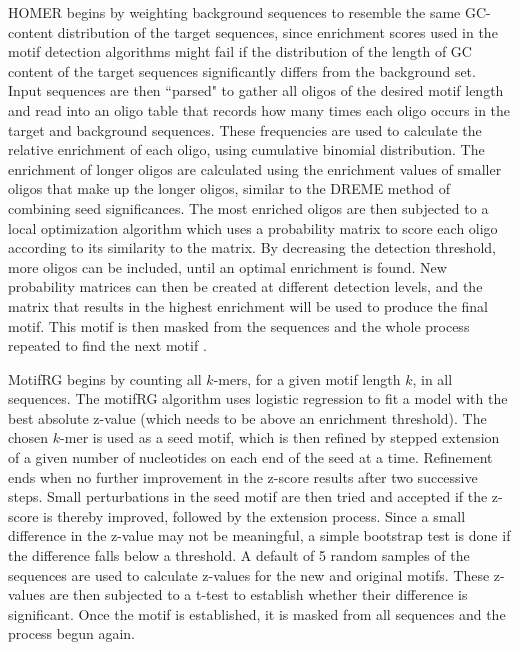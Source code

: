 \documentclass[12pt]{article}
\begin{document}
HOMER \citep{heinz2010simple} begins by weighting background sequences to resemble the same GC-content distribution of the target sequences, since enrichment scores used in the motif detection algorithms might fail if the distribution of the length of GC content of the target sequences significantly
differs from the background set. Input sequences are then ``parsed" to gather all oligos of the desired motif length and read into an oligo table that records how many times each oligo occurs in the target and background sequences. These frequencies are used to calculate the relative enrichment of each oligo, using cumulative binomial distribution. The enrichment of longer oligos are calculated using the enrichment values of smaller oligos that make up the longer oligos, similar to the DREME method of combining seed significances. The most enriched oligos are then subjected to a local optimization algorithm which uses a probability matrix to score each oligo according to its similarity to the matrix. By decreasing the detection threshold, more oligos can be included, until an optimal enrichment is found. New probability matrices can then be created at different detection levels, and the matrix that results in the highest enrichment will be used to produce the final motif. This motif is then masked from the sequences and the whole process repeated to find the next motif \citep{homer_ws}.

MotifRG \citep{yao2014discriminative} begins by counting all $k$-mers, for a given motif length $k$, in all sequences. The motifRG algorithm uses logistic regression to fit a model with the best absolute z-value (which needs to be above an enrichment threshold). The chosen $k$-mer is used as a seed motif, which is then refined by stepped extension of a given number of nucleotides on each end of the seed at a time. Refinement ends when no further improvement in the z-score results after two successive steps. Small perturbations in the seed motif are then tried and accepted if the z-score is thereby improved, followed by the extension process. Since a small difference in the z-value may not be meaningful, a simple bootstrap test is done if the difference falls below a threshold. A default of 5 random samples of the sequences are used to calculate z-values for the new and original motifs. These z-values are then subjected to a t-test to establish whether their difference is significant.
Once the motif is established, it is masked from all sequences and the process begun again.
\end{document}
